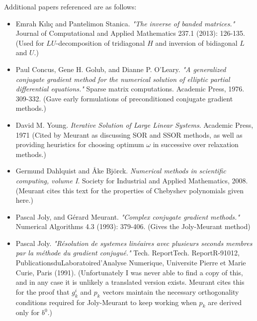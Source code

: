 \documentclass[11pt]{article}
\begin{document}
Additional papers referenced are as follows: \begin{itemize}
\item Emrah Kılıç and Pantelimon Stanica. \emph{"The inverse of banded matrices."} Journal of Computational and Applied Mathematics 237.1 (2013): 126-135. (Used for $LU$-decomposition of tridiagonal $H$ and inversion of bidiagonal $L$ and $U$.)
\item Paul Concus, Gene H. Golub, and Dianne P. O'Leary. \emph{"A generalized conjugate gradient method for the numerical solution of elliptic partial differential equations."} Sparse matrix computations. Academic Press, 1976. 309-332. (Gave early formulations of preconditioned conjugate gradient methods.)
\item David M. Young. \emph{Iterative Solution of Large Linear Systems}. Academic Press, 1971 (Cited by Meurant as discussing SOR and SSOR methods, as well as providing heuristics for choosing optimum $\omega$ in successive over relaxation methods.)
\item Germund Dahlquist and Åke Björck. \emph{Numerical methods in scientific computing, volume I}. Society for Industrial and Applied Mathematics, 2008. (Meurant cites this text for the properties of Chebyshev polynomials given here.)
\item Pascal Joly, and Gérard Meurant. \emph{"Complex conjugate gradient methods."} Numerical Algorithms 4.3 (1993): 379-406. (Gives the Joly-Meurant method)
\item Pascal Joly. \emph{"Résolution de systemes linéaires avec plusieurs seconds membres par la méthode du gradient conjugué."} Tech. ReportTech. ReportR-91012, PublicationsduLaboratoired'Analyse Numerique, Universite Pierre et Marie Curie, Paris (1991). (Unfortunately I was never able to find a copy of this, and in any case it is unlikely a translated version exists. Meurant cites this for the proof that $g_k^i$ and $p_k$ vectors maintain the necessary orthogonality conditions required for Joly-Meurant to keep working when $p_k$ are derived only for $b^0$.)
\end{itemize}
\end{document}
